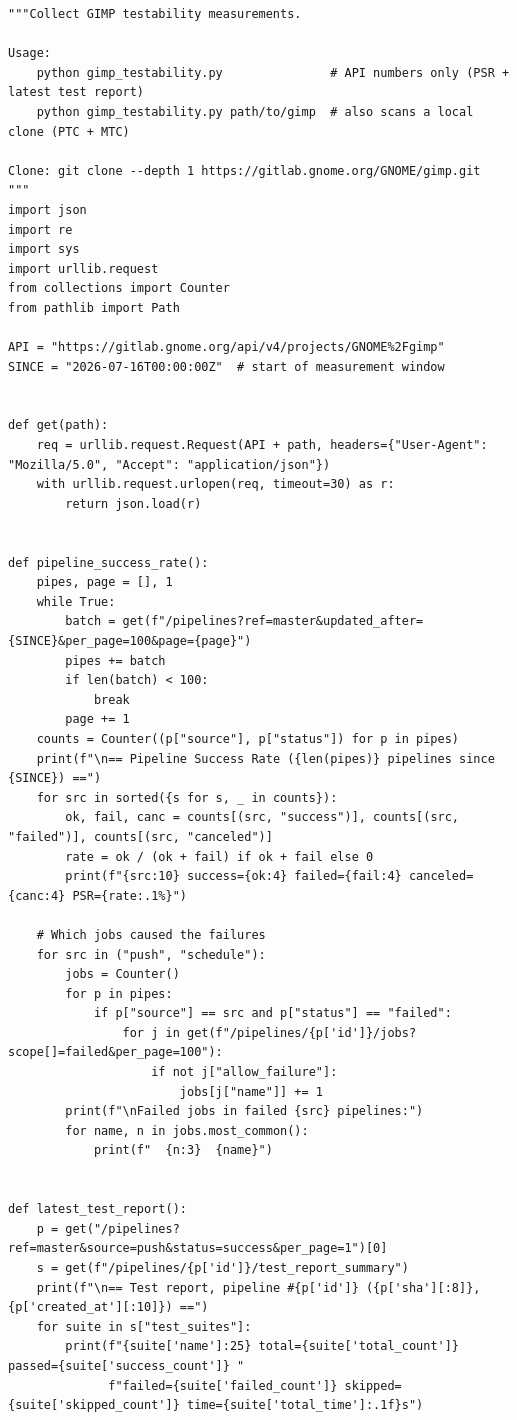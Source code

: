 \begin{lstlisting}[caption={\texttt{gimp\_testability.py}}, label={lst:script}]
"""Collect GIMP testability measurements.

Usage:
    python gimp_testability.py               # API numbers only (PSR + latest test report)
    python gimp_testability.py path/to/gimp  # also scans a local clone (PTC + MTC)

Clone: git clone --depth 1 https://gitlab.gnome.org/GNOME/gimp.git
"""
import json
import re
import sys
import urllib.request
from collections import Counter
from pathlib import Path

API = "https://gitlab.gnome.org/api/v4/projects/GNOME%2Fgimp"
SINCE = "2026-07-16T00:00:00Z"  # start of measurement window


def get(path):
    req = urllib.request.Request(API + path, headers={"User-Agent": "Mozilla/5.0", "Accept": "application/json"})
    with urllib.request.urlopen(req, timeout=30) as r:
        return json.load(r)


def pipeline_success_rate():
    pipes, page = [], 1
    while True:
        batch = get(f"/pipelines?ref=master&updated_after={SINCE}&per_page=100&page={page}")
        pipes += batch
        if len(batch) < 100:
            break
        page += 1
    counts = Counter((p["source"], p["status"]) for p in pipes)
    print(f"\n== Pipeline Success Rate ({len(pipes)} pipelines since {SINCE}) ==")
    for src in sorted({s for s, _ in counts}):
        ok, fail, canc = counts[(src, "success")], counts[(src, "failed")], counts[(src, "canceled")]
        rate = ok / (ok + fail) if ok + fail else 0
        print(f"{src:10} success={ok:4} failed={fail:4} canceled={canc:4} PSR={rate:.1%}")

    # Which jobs caused the failures
    for src in ("push", "schedule"):
        jobs = Counter()
        for p in pipes:
            if p["source"] == src and p["status"] == "failed":
                for j in get(f"/pipelines/{p['id']}/jobs?scope[]=failed&per_page=100"):
                    if not j["allow_failure"]:
                        jobs[j["name"]] += 1
        print(f"\nFailed jobs in failed {src} pipelines:")
        for name, n in jobs.most_common():
            print(f"  {n:3}  {name}")


def latest_test_report():
    p = get("/pipelines?ref=master&source=push&status=success&per_page=1")[0]
    s = get(f"/pipelines/{p['id']}/test_report_summary")
    print(f"\n== Test report, pipeline #{p['id']} ({p['sha'][:8]}, {p['created_at'][:10]}) ==")
    for suite in s["test_suites"]:
        print(f"{suite['name']:25} total={suite['total_count']} passed={suite['success_count']} "
              f"failed={suite['failed_count']} skipped={suite['skipped_count']} time={suite['total_time']:.1f}s")



\end{lstlisting}
